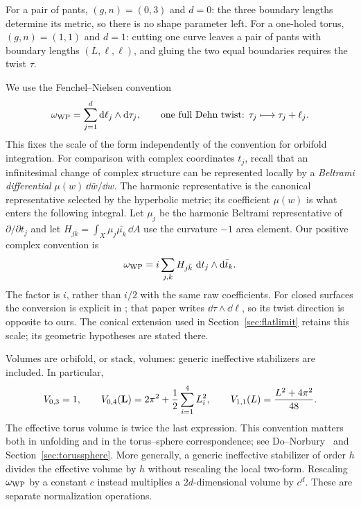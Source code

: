 For a pair of pants, $(g,n)=(0,3)$ and $d=0$: the three boundary
lengths determine its metric, so there is no shape parameter left.
For a one-holed torus, $(g,n)=(1,1)$ and $d=1$: cutting one curve
leaves a pair of pants with boundary lengths $(L,\ell,\ell)$,
and gluing the two equal boundaries requires the twist $\tau$.

We use the Fenchel--Nielsen convention
\begin{equation}
 \omega_{\mathrm{WP}}=\sum_{j=1}^{d}\mathop{}\!\mathrm d\ell_j\wedge\mathop{}\!\mathrm d\tau_j,
 \qquad \text{one full Dehn twist: }\tau_j\longmapsto\tau_j+\ell_j.
 \label{eq:fn}
\end{equation}
This fixes the scale of the form independently of the convention for
orbifold integration. For comparison with complex coordinates $t_j$, recall that an
infinitesimal change of complex structure can be represented locally
by a \emph{Beltrami differential} $\mu(w)\,\dd\bar w/\dd w$.
The harmonic representative is the canonical representative selected
by the hyperbolic metric; its coefficient $\mu(w)$ is what enters
the following integral. Let
$\mu_j$ be the harmonic Beltrami representative of $\partial/\partial t_j$
and let $H_{j\bar k}=\int_X\mu_j\overline{\mu_k}\,\dd A$ use the curvature
$-1$ area element. Our positive complex convention is
\[
 \omega_{\mathrm{WP}}=i\sum_{j,k}H_{j\bar k}\,\mathop{}\!\mathrm d t_j\wedge\mathop{}\!\mathrm d\bar t_k.
\]
The factor is $i$, rather than $i/2$ with the same raw coefficients.
For closed surfaces the conversion is explicit in
\cite[Section 6.1, equation (38)]{KawazumiWP}; that paper writes
$\dd\tau\wedge\dd\ell$, so its twist direction is opposite to ours.
The conical extension used in Section~\ref{sec:flatlimit} retains this
scale; its geometric hypotheses are stated there.

Volumes are orbifold, or stack, volumes: generic ineffective stabilizers are
included. In particular,
\begin{equation}
 V_{0,3}=1,\qquad
 V_{0,4}(\mathbf L)=2\pi^2+\frac12\sum_{i=1}^4L_i^2,
 \qquad
 V_{1,1}(L)=\frac{L^2+4\pi^2}{48}.
 \label{eq:basevolumes}
\end{equation}
The effective torus volume is twice the last expression. This convention
matters both in unfolding and in the torus--sphere correspondence; see
Do--Norbury~\cite{DoNorbury} and Section~\ref{sec:torussphere}.
More generally, a generic ineffective stabilizer of order $h$ divides the
effective volume by $h$ without rescaling the local two-form. Rescaling
$\omega_{\mathrm{WP}}$ by a constant $c$ instead multiplies a $2d$-dimensional
volume by $c^d$. These are separate normalization operations.

